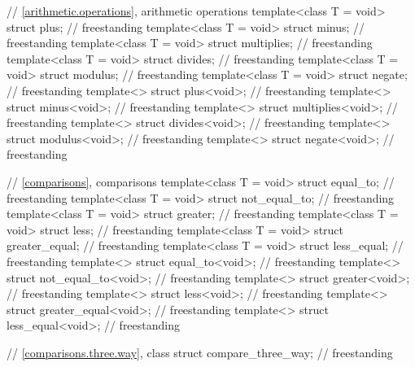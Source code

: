 \begin{codeblock}
{  // \ref{arithmetic.operations}, arithmetic operations
  template<class T = void> struct plus;                                             // freestanding
  template<class T = void> struct minus;                                            // freestanding
  template<class T = void> struct multiplies;                                       // freestanding
  template<class T = void> struct divides;                                          // freestanding
  template<class T = void> struct modulus;                                          // freestanding
  template<class T = void> struct negate;                                           // freestanding
  template<> struct plus<void>;                                                     // freestanding
  template<> struct minus<void>;                                                    // freestanding
  template<> struct multiplies<void>;                                               // freestanding
  template<> struct divides<void>;                                                  // freestanding
  template<> struct modulus<void>;                                                  // freestanding
  template<> struct negate<void>;                                                   // freestanding

  // \ref{comparisons}, comparisons
  template<class T = void> struct equal_to;                                         // freestanding
  template<class T = void> struct not_equal_to;                                     // freestanding
  template<class T = void> struct greater;                                          // freestanding
  template<class T = void> struct less;                                             // freestanding
  template<class T = void> struct greater_equal;                                    // freestanding
  template<class T = void> struct less_equal;                                       // freestanding
  template<> struct equal_to<void>;                                                 // freestanding
  template<> struct not_equal_to<void>;                                             // freestanding
  template<> struct greater<void>;                                                  // freestanding
  template<> struct less<void>;                                                     // freestanding
  template<> struct greater_equal<void>;                                            // freestanding
  template<> struct less_equal<void>;                                               // freestanding

  // \ref{comparisons.three.way}, class 
  struct compare_three_way;                                                         // freestanding

}
\end{codeblock}
